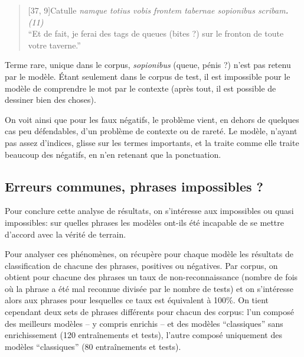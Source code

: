 \begin{quote}[37, 9]{Catulle}
    \textit{namque totius vobis frontem tabernae sopionibus scribam\textbf{.} (11)} \\
    \enquote{Et de fait, je ferai des tags de queues (bites ?) sur le fronton de toute votre taverne.}
\end{quote}

Terme rare, unique dans le corpus, \textit{sopionibus} (queue, pénis ?) n'est pas retenu par le modèle. Étant seulement dans le corpus de test, il est impossible pour le modèle de comprendre le mot par le contexte (après tout, il est possible de dessiner bien des choses).

On voit ainsi que pour les faux négatifs, le problème vient, en dehors de quelques cas peu défendables, d'un problème de contexte ou de rareté. Le modèle, n'ayant pas assez d'indices, glisse sur les termes importants, et la traite comme elle traite beaucoup des négatifs, en n'en retenant que la ponctuation.

\subsection{Erreurs communes, phrases impossibles ?}

Pour conclure cette analyse de résultats, on s'intéresse aux impossibles ou quasi impossibles: sur quelles phrases les modèles ont-ils été incapable de se mettre d'accord avec la vérité de terrain. 

Pour analyser ces phénomènes, on récupère pour chaque modèle les résultats de classification de chacune des phrases, positives ou négatives. Par corpus, on obtient pour chacune des phrases un taux de non-reconnaissance (nombre de fois où la phrase a été mal reconnue divisée par le nombre de tests) et on s'intéresse alors aux phrases pour lesquelles ce taux est équivalent à 100\%. On tient cependant deux sets de phrases différents pour chacun des corpus: l'un composé des meilleurs modèles -- y compris enrichis -- et des modèles ``classiques'' sans enrichissement (120 entraînements et tests), l'autre composé uniquement des modèles ``classiques'' (80 entraînements et tests).

